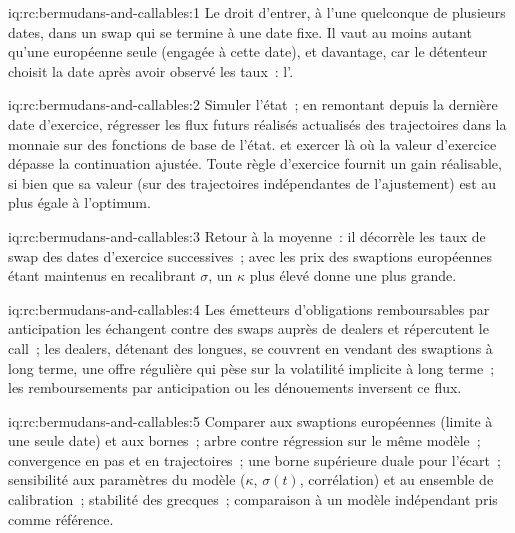 \begin{solution}{iq:rc:bermudans-and-callables:1}
Le droit d'entrer, à l'une quelconque de plusieurs dates, dans un swap qui se termine à une date fixe. Il
vaut au moins autant qu'une européenne seule (engagée à cette date), et davantage, car le
détenteur choisit la date après avoir observé les taux~: l'.
\end{solution}

\begin{solution}{iq:rc:bermudans-and-callables:2}
Simuler l'état~; en remontant depuis la dernière date d'exercice, régresser les flux futurs réalisés actualisés des
trajectoires dans la monnaie sur des fonctions de base de l'état.
et exercer là où la valeur d'exercice dépasse la continuation ajustée. Toute
règle d'exercice fournit un gain réalisable, si bien que sa valeur (sur des trajectoires indépendantes de l'ajustement)
est au plus égale à l'optimum.
\end{solution}

\begin{solution}{iq:rc:bermudans-and-callables:3}
Retour à la moyenne~: il décorrèle les taux de swap des dates d'exercice successives~; avec
les prix des swaptions européennes étant maintenus en recalibrant $\sigma$, un $\kappa$ plus élevé donne une
 plus grande.
\end{solution}

\begin{solution}{iq:rc:bermudans-and-callables:4}
Les émetteurs d'obligations remboursables par anticipation les échangent contre des swaps auprès de dealers et répercutent le call~; les dealers,
détenant des  longues, se couvrent en vendant des swaptions à long terme, une offre régulière qui
pèse sur la volatilité implicite à long terme~; les remboursements par anticipation ou les dénouements inversent ce flux.
\end{solution}

\begin{solution}{iq:rc:bermudans-and-callables:5}
Comparer aux swaptions européennes (limite à une seule date) et aux bornes~; arbre contre régression sur
le même modèle~; convergence en pas et en trajectoires~; une borne supérieure duale pour l'écart~;
sensibilité aux paramètres du modèle ($\kappa$, $\sigma(t)$, corrélation) et au
ensemble de calibration~; stabilité des grecques~; comparaison à un modèle indépendant pris comme référence.
\end{solution}

